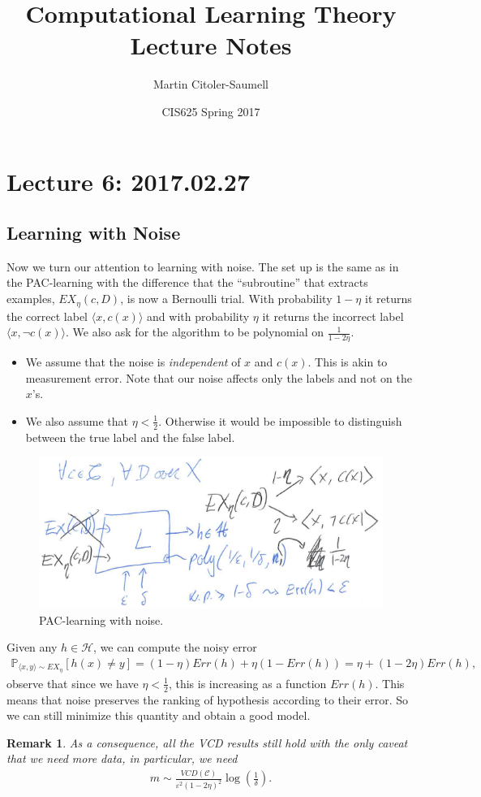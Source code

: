 \documentclass[12pt, letterpaper]{article}
\title{Computational Learning Theory Lecture Notes}
\author{Martin Citoler-Saumell}
\date{CIS625 Spring 2017}
\numberwithin{equation}{section} %
\newcommand{\mb}{\mathbb}
\newcommand{\mc}{\mathcal}
\newcommand{\ve}{\varepsilon}
\newtheorem{remark}[theorem]{Remark}
\theoremstyle{definition}
\theoremstyle{remark}
\begin{document}
\section{Lecture 6: 2017.02.27}

\subsection{Learning with Noise}
Now we turn our attention to learning with noise. The set up is the same as in the PAC-learning with the difference that the ``subroutine'' that extracts examples, $EX_\eta(c,D)$, is now a Bernoulli trial. With probability $1-\eta$ it returns the correct label $\langle x, c(x) \rangle$ and with probability $\eta$ it returns the incorrect label $\langle x, \lnot c(x) \rangle$. We also ask for the algorithm to be polynomial on $\frac1{1-2\eta}$.
\begin{itemize}
\item We assume that the noise is \emph{independent} of $x$ and $c(x)$. This is akin to measurement error. Note that our noise affects only the labels and not on the $x$'s.
\item We also assume that $\eta < \frac12$. Otherwise it would be impossible to distinguish between the true label and the false label.
\end{itemize}
\begin{figure}[H]
\centering
\includegraphics[width=0.6\linewidth]{../img/noise-pac.png}
\caption{PAC-learning with noise.}
\end{figure}

Given any $h\in \mc H$, we can compute the noisy error
\begin{align}
\mb P_{\langle x, y\rangle \sim EX_\eta}[h(x)\ne y] = (1-\eta)Err(h) + \eta(1-Err(h)) = \eta + (1-2\eta)Err(h),
\end{align}
observe that since we have $\eta < \frac12$, this is increasing as a function $Err(h)$. This means that noise preserves the ranking of hypothesis according to their error. So we can still minimize this quantity and obtain a good model.
\begin{remark}
As a consequence, all the VCD results still hold with the only caveat that we need more data, in particular, we need 
\begin{align}
m \sim \frac{VCD(\mc C)}{\ve^2(1-2\eta)^2}\log\left(\frac1\delta\right).
\end{align}
\end{remark}
\end{document}
